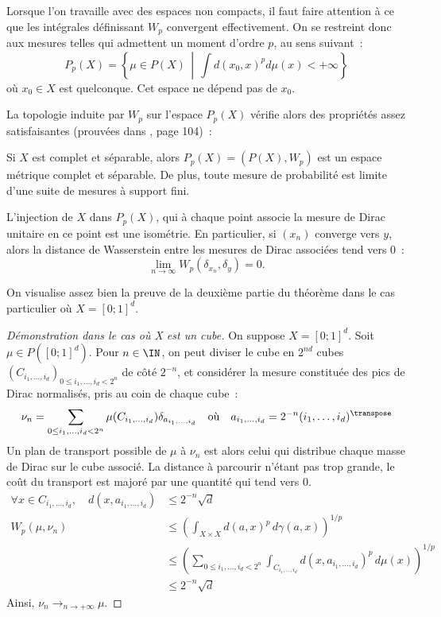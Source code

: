 Lorsque l'on travaille avec des espaces non compacts, il faut faire attention à ce que les intégrales définissant $W_p$ convergent effectivement. On se restreint donc aux mesures telles qui admettent un \og moment d'ordre $p$\fg, au sens suivant~:
\[P_p(X) = \left\{\mu \in P(X)\,\middle|\, \int d(x_0,x)^p d\mu(x) < +\infty \right\} \]
où $x_0 \in X$ est quelconque. Cet espace ne dépend pas de $x_0$.

La topologie induite par $W_p$ sur l'espace $P_p(X)$ vérifie alors des propriétés assez satisfaisantes (prouvées dans \cite{villani08}, page 104)~: 
\begin{theoreme}
Si $X$ est complet et séparable, alors $P_p(X) = (P(X),W_p)$ est un espace métrique complet et séparable. De plus, toute mesure de probabilité est limite d'une suite de mesures à support fini.
\end{theoreme}
\begin{remarque}
L'injection de $X$ dans $P_p(X)$, qui à chaque point associe la mesure de Dirac unitaire en ce point est une isométrie. En particulier, si $(x_n)$ converge vers $y$, alors la distance de Wasserstein entre les mesures de Dirac associées tend vers 0~:
\[\lim_{n \rightarrow \infty} W_p(\delta_{x_n},\delta_y) = 0. \]
\end{remarque}

On visualise assez bien la preuve de la deuxième partie du théorème dans le cas particulier où $X = [0;1]^d$.
\begin{proof}[Démonstration dans le cas où X est un cube]
On suppose $X = [0;1]^d$.
Soit $\mu \in P([0;1]^d)$. Pour $n \in \IN$, on peut diviser le cube en $2^{nd}$ cubes $(C_{i_1,\ldots,i_d})_{0 \le i_1,\ldots,i_d < 2^n}$ de côté $2^{-n}$, et considérer la mesure constituée des pics de Dirac normalisés, pris au coin de chaque cube~:
\[\nu_n = \sum_{0 \le i_1,\ldots,i_d < 2^n} \mu(C_{i_1,\ldots,i_d}) \delta_{a_{i_1,\ldots,i_d}} 
\quad \text{où} \quad
a_{i_1,\ldots,i_d} = 2^{-n}(i_1,\ldots,i_d)^\transpose\]
Un plan de transport possible de $\mu$ à $\nu_n$ est alors celui qui distribue chaque masse de Dirac sur le cube associé. La distance à parcourir n'étant pas trop grande, le coût du transport est majoré par une quantité qui tend vers 0.
\[
\begin{split}
\forall x \in C_{i_1,\ldots,i_d},\quad d(x,a_{i_1,\ldots,i_d}) & \le 2^{-n} \sqrt{d} \\
W_p(\mu,\nu_n) &\le \left(\int_{X\times X} d(a,x)^p\,d\gamma(a,x)\right)^{1/p} \\
&\le \left(\sum_{0 \le i_1,\ldots,i_d < 2^n} \int_{C_{i_1,\ldots,i_d}} d(x,a_{i_1,\ldots,i_d})^p \, d\mu (x) \right)^{1/p} \\
& \le 2^{-n}\sqrt{d}
\end{split}
\]
Ainsi, $\nu_n \rightarrow_{n \rightarrow +\infty} \mu$.
\end{proof}

